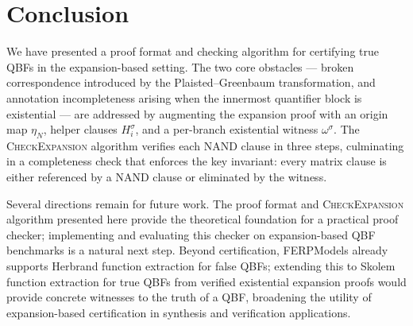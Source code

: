 \documentclass{article}
\begin{document}
\section{Conclusion}\label{sec:conclusion}
We have presented a proof format and checking algorithm for certifying true QBFs
in the expansion-based setting. The two core obstacles --- broken correspondence
introduced by the Plaisted--Greenbaum transformation, and annotation incompleteness
arising when the innermost quantifier block is existential --- are addressed by
augmenting the expansion proof with an origin map $\eta_N$, helper clauses
$H_i^\sigma$, and a per-branch existential witness $\omega^\sigma$. The
\textsc{CheckExpansion} algorithm verifies each NAND clause in three steps,
culminating in a completeness check that enforces the key invariant: every matrix
clause is either referenced by a NAND clause or eliminated by the witness.

Several directions remain for future work. The proof format and
\textsc{CheckExpansion} algorithm presented here provide the theoretical foundation
for a practical proof checker; implementing and evaluating this checker on
expansion-based QBF benchmarks is a natural next step. Beyond certification,
FERPModels already supports Herbrand function extraction for false QBFs; extending
this to Skolem function extraction for true QBFs from verified existential
expansion proofs would provide concrete witnesses to the truth of a QBF,
broadening the utility of expansion-based certification in synthesis and
verification applications.



\end{document}
